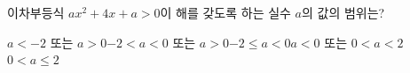 \hspace*{2mm}\begin{minipage}[t]{\dimexpr\linewidth-2mm\relax}\vspace{0pt}
이차부등식 $ax^2+4x+a>0$이 해를 갖도록 하는 실수 $a$의 값의 범위는?
\begin{choicesii}{$a<-2$ 또는 $a>0$}{$-2<a<0$ 또는 $a>0$}{$-2\le a<0$}{$a<0$ 또는 $0<a<2$}{$0<a\le 2$}\end{choicesii}\end{minipage}
